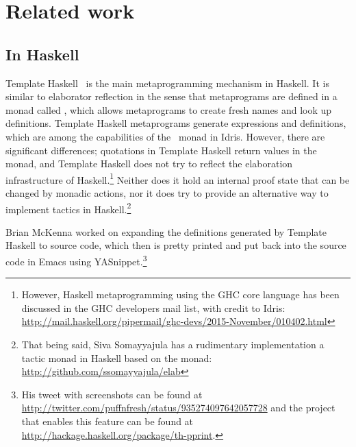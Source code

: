 \section{Related work} \label{sec:relatedwork}

\subsection{In Haskell}

Template Haskell~\cite{th} is the main metaprogramming mechanism in Haskell.
It is similar to elaborator reflection in the sense that metaprograms are
defined in a monad called , which allows metaprograms to create fresh
names and look up definitions.
Template Haskell metaprograms generate expressions and definitions, which are
among the capabilities of the \Elab\ monad in Idris.
However, there are significant differences;
quotations in Template Haskell return values in the  monad, and Template
Haskell does not try to reflect the elaboration infrastructure of
Haskell.\footnote{However, Haskell metaprogramming using the GHC core language
has been discussed in the GHC developers mail list, with credit to Idris:
\url{http://mail.haskell.org/pipermail/ghc-devs/2015-November/010402.html}}
Neither does it hold an internal proof state that can be changed by monadic
actions, nor it does try to provide an alternative way to implement tactics in
Haskell.\footnote{That being said, Siva Somayyajula has a rudimentary
implementation a tactic monad in Haskell based on the  monad:
\url{http://github.com/ssomayyajula/elab}}

Brian McKenna worked on expanding the definitions generated by Template Haskell
to source code, which then is pretty printed and put back into the source code
in Emacs using YASnippet.\footnote{His tweet with screenshots can be found at
\url{http://twitter.com/puffnfresh/status/935274097642057728} and the project
that enables this feature can be found at
\url{http://hackage.haskell.org/package/th-pprint}.}


